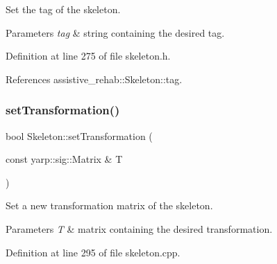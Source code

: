 Set the tag of the skeleton. 


\begin{DoxyParams}{Parameters}
{\em tag} & string containing the desired tag. \\
\hline
\end{DoxyParams}


Definition at line 275 of file skeleton.\+h.


\begin{DoxyCode}{0}

\end{DoxyCode}


References assistive\+\_\+rehab\+::\+Skeleton\+::tag.

\mbox{\label{classassistive__rehab_1_1Skeleton_a3486cbd7f59e75c1d9ef26cbc05bb72f}} 
\subsubsection{\texorpdfstring{setTransformation()}{setTransformation()}}
{\footnotesize\ttfamily bool Skeleton\+::set\+Transformation (\begin{DoxyParamCaption}\item[{const yarp\+::sig\+::\+Matrix \&}]{T }\end{DoxyParamCaption})\hspace{0.3cm}{\ttfamily [inherited]}}



Set a new transformation matrix of the skeleton. 


\begin{DoxyParams}{Parameters}
{\em T} & matrix containing the desired transformation. \\
\hline
\end{DoxyParams}


Definition at line 295 of file skeleton.\+cpp.


\begin{DoxyCode}{0}

\end{DoxyCode}


